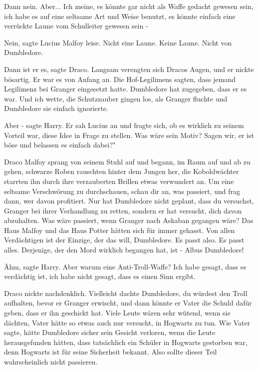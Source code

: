 \glqq{}Dann nein. Aber... Ich meine, es könnte gar nicht als Waffe gedacht
gewesen sein, ich habe es auf eine seltsame Art und Weise benutzt, es könnte
einfach eine verrückte Laune vom Schulleiter gewesen sein -\grqq{}

\glqq{}Nein\grqq{}, sagte Lucius Malfoy leise. \glqq{}Nicht eine Laune. Keine
Laune. Nicht von Dumbledore.\grqq{}

\glqq{}Dann ist er es\grqq{}, sagte Draco. Langsam verengten sich Dracos Augen,
und er nickte bösartig. \glqq{}Er war es von Anfang an. Die Hof-Legilimens
sagten, dass jemand Legilimenz bei Granger eingesetzt hatte. Dumbledore hat
zugegeben, dass er es war. Und ich wette, die Schutzzauber gingen los, als
Granger fluchte und Dumbledore sie einfach ignorierte.\grqq{}

\glqq{}Aber -\grqq{} sagte Harry. Er sah Lucius an und fragte sich, ob es
wirklich zu seinem Vorteil war, diese Idee in Frage zu stellen. \glqq{}Was wäre
sein Motiv? Sagen wir, er ist böse und belassen es einfach dabei?"

Draco Malfoy sprang von seinem Stuhl auf und begann, im Raum auf und ab zu
gehen, schwarze Roben rauschten hinter dem Jungen her, die Koboldwächter
starrten ihn durch ihre verzauberten Brillen etwas verwundert an. \glqq{}Um eine
seltsame Verschwörung zu durchschauen, schau dir an, was passiert, und frag
dann, wer davon profitiert. Nur hat Dumbledore nicht geplant, dass du versuchst,
Granger bei ihrer Verhandlung zu retten, sondern er hat versucht, dich davon
abzuhalten. Was wäre passiert, wenn Granger nach Askaban gegangen wäre? Das Haus
Malfoy und das Haus Potter hätten sich für immer gehasst. Von allen Verdächtigen
ist der Einzige, der das will, Dumbledore. Es passt also. Es passt alles.
Derjenige, der den Mord wirklich begangen hat, ist - Albus Dumbledore!\grqq{}

\glqq{}Ähm\grqq{}, sagte Harry. \glqq{}Aber warum eine Anti-Troll-Waffe? Ich habe
gesagt, dass es verdächtig ist, ich habe nicht gesagt, dass es einen Sinn
ergibt.\grqq{}

Draco nickte nachdenklich. \glqq{}Vielleicht dachte Dumbledore, du würdest den
Troll aufhalten, bevor er Granger erwischt, und dann könnte er Vater die Schuld
dafür geben, dass er ihn geschickt hat. Viele Leute wären sehr wütend, wenn sie
dächten, Vater hätte so etwas auch nur versucht, in Hogwarts zu tun. Wie Vater
sagte, hätte Dumbledore sicher sein Gesicht verloren, wenn die Leute
herausgefunden hätten, dass tatsächlich ein Schüler in Hogwarts gestorben war,
denn Hogwarts ist für seine Sicherheit bekannt. Also sollte dieser Teil
wahrscheinlich nicht passieren.\grqq{}

